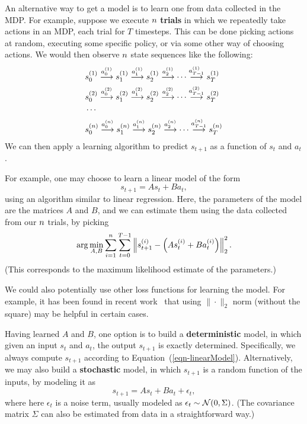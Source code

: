 \documentclass{article}
\begin{document}
An alternative way to get a model is to learn one from data collected in the MDP.  For example, suppose we
execute $\nexp$ {\bf trials} in which we repeatedly take actions in an MDP, each trial
for $T$ timesteps.  This can be done picking actions at random, executing some specific policy,
or via some other way of choosing actions.  We would then observe $\nexp$ state sequences like the following:
\begin{eqnarray*}
&s_0^{(1)} \stackrel{a_0^{(1)}}{\longrightarrow} s_1^{(1)} \stackrel{a_1^{(1)}}{\longrightarrow} s_2^{(1)}
\stackrel{a_2^{(1)}}{\longrightarrow} \cdots \stackrel{a_{T-1}^{(1)}}{\longrightarrow} s_T^{(1)} \\
&s_0^{(2)} \stackrel{a_0^{(2)}}{\longrightarrow} s_1^{(2)} \stackrel{a_1^{(2)}}{\longrightarrow} s_2^{(2)}
\stackrel{a_2^{(2)}}{\longrightarrow} \cdots \stackrel{a_{T-1}^{(2)}}{\longrightarrow} s_T^{(2)} \\
&\cdots \hbox to 2.1in{}\\
&s_0^{(\nexp)} \stackrel{a_0^{(\nexp)}}{\longrightarrow} s_1^{(\nexp)} \stackrel{a_1^{(\nexp)}}{\longrightarrow} s_2^{(\nexp)}
\stackrel{a_2^{(\nexp)}}{\longrightarrow} \cdots \stackrel{a_{T-1}^{(\nexp)}}{\longrightarrow} s_T^{(\nexp)}
\end{eqnarray*}
We can then apply a learning algorithm to predict $s_{t+1}$ as a function of $s_t$ and $a_t$.

For example, one may choose to learn a linear model of the form
\begin{equation}
s_{t+1} = A s_{t} + B a_{t},             \label{eqn-linearModel}
\end{equation}
using an algorithm similar to linear regression.  Here, the parameters of the model are
the matrices $A$ and $B$, and we can estimate them using the data collected from our $\nexp$ trials,
by picking
\begin{equation*}
\arg \min_{A,B} \sum_{i=1}^\nexp \sum_{t=0}^{T-1} \left\| s^{(i)}_{t+1} - \left(A s^{(i)}_t + B a^{(i)}_t\right) \right\|_2^2.
\end{equation*}
(This corresponds to the maximum likelihood estimate of the parameters.)

We could also potentially use other loss functions for learning the model. For example, it has been found in recent work~\cite{luo2018algorithmic} that using $\|\cdot\|_2$ norm (without the square) may be helpful in certain cases. 

Having learned $A$ and $B$, one option is to build a {\bf deterministic} model, in which given
an input $s_t$ and $a_t$, the output $s_{t+1}$ is exactly determined.  Specifically, we always
compute $s_{t+1}$ according to Equation~(\ref{eqn-linearModel}).
Alternatively, we may also build a {\bf stochastic} model, in which $s_{t+1}$ is a random function
of the inputs, by modeling it as
\[
s_{t+1} = A s_{t} + B a_{t} + \epsilon_t,
\]
where here $\epsilon_t$ is a noise term, usually modeled as $\epsilon_t \sim {\cal N}(0,\Sigma)$.
(The covariance matrix $\Sigma$ can also be estimated from data in a straightforward way.)
\end{document}
